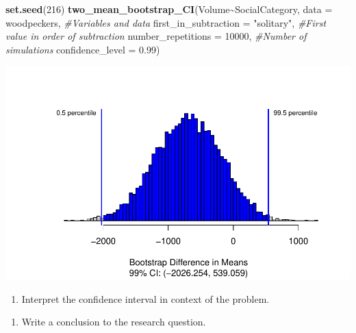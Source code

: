 \documentclass[
]{report}
\newenvironment{Shaded}{\begin{snugshade}}{\end{snugshade}}
\newcommand{\AttributeTok}[1]{\textcolor[rgb]{0.13,0.29,0.53}{#1}}
\newcommand{\CommentTok}[1]{\textcolor[rgb]{0.56,0.35,0.01}{\textit{#1}}}
\newcommand{\DecValTok}[1]{\textcolor[rgb]{0.00,0.00,0.81}{#1}}
\newcommand{\FloatTok}[1]{\textcolor[rgb]{0.00,0.00,0.81}{#1}}
\newcommand{\FunctionTok}[1]{\textcolor[rgb]{0.13,0.29,0.53}{\textbf{#1}}}
\newcommand{\NormalTok}[1]{#1}
\newcommand{\SpecialCharTok}[1]{\textcolor[rgb]{0.81,0.36,0.00}{\textbf{#1}}}
\newcommand{\StringTok}[1]{\textcolor[rgb]{0.31,0.60,0.02}{#1}}
\providecommand{\tightlist}{%
  \setlength{\itemsep}{0pt}\setlength{\parskip}{0pt}}
\begin{document}
\begin{Shaded}
\begin{Highlighting}[]
\FunctionTok{set.seed}\NormalTok{(}\DecValTok{216}\NormalTok{)}
\FunctionTok{two\_mean\_bootstrap\_CI}\NormalTok{(Volume}\SpecialCharTok{\textasciitilde{}}\NormalTok{SocialCategory, }\AttributeTok{data =}\NormalTok{ woodpeckers,  }\CommentTok{\#Variables and data}
                      \AttributeTok{first\_in\_subtraction =} \StringTok{"solitary"}\NormalTok{, }\CommentTok{\#First value in order of subtraction}
                      \AttributeTok{number\_repetitions =} \DecValTok{10000}\NormalTok{,  }\CommentTok{\#Number of simulations}
                      \AttributeTok{confidence\_level =} \FloatTok{0.99}\NormalTok{)}
\end{Highlighting}
\end{Shaded}

\begin{center}\includegraphics[width=0.7\linewidth]{14-UR-module12_review_files/figure-latex/unnamed-chunk-4-1} \end{center}

\begin{enumerate}
\def\labelenumi{\arabic{enumi}.}
\setcounter{enumi}{5}
\tightlist
\item
  Interpret the confidence interval in context of the problem.
\end{enumerate}

\vspace{0.5in}

\begin{enumerate}
\def\labelenumi{\arabic{enumi}.}
\setcounter{enumi}{6}
\tightlist
\item
  Write a conclusion to the research question.
\end{enumerate}

\vspace{0.5in}

\newpage
\end{document}
